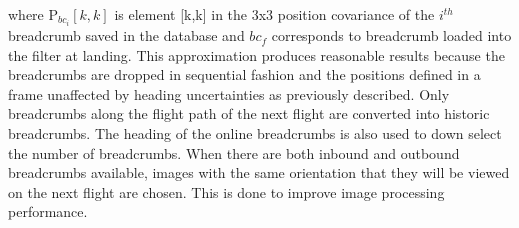\noindent where $\text{P}_{bc_i}[k,k]$ is element [k,k] in the 3x3 position covariance of the $i^{th}$ breadcrumb saved in the database and $bc_f$ corresponds to breadcrumb loaded into the filter at landing. This approximation produces reasonable results because the breadcrumbs are dropped in sequential fashion and the positions defined in a frame unaffected by heading uncertainties as previously described. Only breadcrumbs along the flight path of the next flight are converted into historic breadcrumbs. The heading of the online breadcrumbs is also used to down select the number of breadcrumbs. When there are both inbound and outbound breadcrumbs available, images with the same orientation that they will be viewed on the next flight are chosen.  This is done to improve image processing performance.
